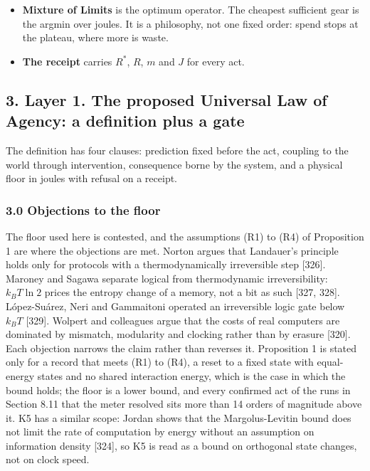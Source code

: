 \documentclass[
  10pt,
]{article}
\providecommand{\tightlist}{%
  \setlength{\itemsep}{0pt}\setlength{\parskip}{0pt}}
\begin{document}
\begin{itemize}
\tightlist
\item
  \textbf{Mixture of Limits} is the optimum operator. The cheapest
  sufficient gear is the argmin over joules. It is a philosophy, not one
  fixed order: spend stops at the plateau, where more is waste.
\item
  \textbf{The receipt} carries \(R^*\), \(R\), \(m\) and \(J\) for every
  act.
\end{itemize}

\subsection{3. Layer 1. The proposed Universal Law of Agency: a
definition plus a
gate}\label{layer-1.-the-proposed-universal-law-of-agency-a-definition-plus-a-gate}

The definition has four clauses: prediction fixed before the act,
coupling to the world through intervention, consequence borne by the
system, and a physical floor in joules with refusal on a receipt.

\subsubsection{3.0 Objections to the
floor}\label{objections-to-the-floor}

The floor used here is contested, and the assumptions (R1) to (R4) of
Proposition 1 are where the objections are met. Norton argues that
Landauer's principle holds only for protocols with a thermodynamically
irreversible step {[}326{]}. Maroney and Sagawa separate logical from
thermodynamic irreversibility: \(k_B T\ln 2\) prices the entropy change
of a memory, not a bit as such {[}327, 328{]}. López-Suárez, Neri and
Gammaitoni operated an irreversible logic gate below \(k_B T\)
{[}329{]}. Wolpert and colleagues argue that the costs of real computers
are dominated by mismatch, modularity and clocking rather than by
erasure {[}320{]}. Each objection narrows the claim rather than reverses
it. Proposition 1 is stated only for a record that meets (R1) to (R4), a
reset to a fixed state with equal-energy states and no shared
interaction energy, which is the case in which the bound holds; the
floor is a lower bound, and every confirmed act of the runs in Section
8.11 that the meter resolved sits more than 14 orders of magnitude above
it. K5 has a similar scope: Jordan shows that the Margolus-Levitin bound
does not limit the rate of computation by energy without an assumption
on information density {[}324{]}, so K5 is read as a bound on orthogonal
state changes, not on clock speed.
\end{document}
